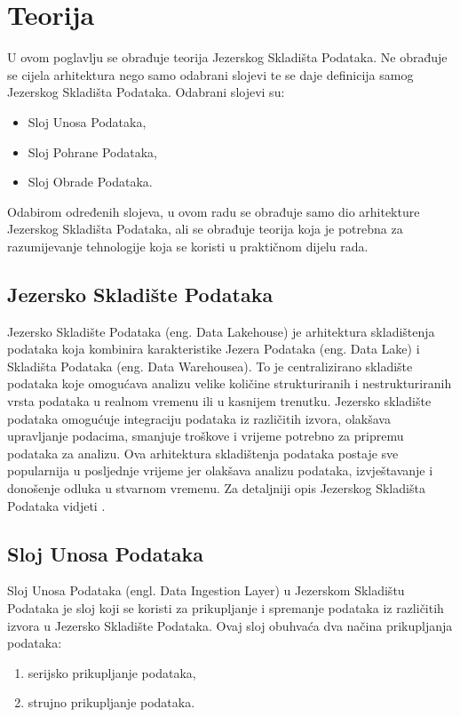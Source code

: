 \chapter{Teorija} \label{chapter:teorija} 

U ovom poglavlju se obrađuje teorija Jezerskog Skladišta Podataka. Ne obrađuje
se cijela arhitektura nego samo odabrani slojevi te se daje definicija samog
Jezerskog Skladišta Podataka. Odabrani slojevi su:
\begin{itemize}
    \item Sloj Unosa Podataka,
    \item Sloj Pohrane Podataka,
    \item Sloj Obrade Podataka.
\end{itemize}
Odabirom određenih slojeva, u ovom radu se obrađuje samo dio arhitekture
Jezerskog Skladišta Podataka, ali se obrađuje teorija koja je potrebna za
razumijevanje tehnologije koja se koristi u praktičnom dijelu rada. 

\section{Jezersko Skladište Podataka} \label{section:jezersko_skladiste_podataka}

Jezersko Skladište Podataka (eng. Data Lakehouse) je arhitektura skladištenja
podataka koja kombinira karakteristike Jezera Podataka (eng. Data Lake) i
Skladišta Podataka (eng. Data Warehousea). To je centralizirano skladište
podataka koje omogućava analizu velike količine strukturiranih i
nestrukturiranih vrsta podataka u realnom vremenu ili u kasnijem trenutku.
Jezersko skladište podataka omogućuje integraciju podataka iz različitih izvora,
olakšava upravljanje podacima, smanjuje troškove i vrijeme potrebno za pripremu
podataka za analizu. Ova arhitektura skladištenja podataka postaje sve
popularnija u posljednje vrijeme jer olakšava analizu podataka, izvještavanje i
donošenje odluka u stvarnom vremenu. Za detaljniji opis Jezerskog Skladišta
Podataka vidjeti \cite{datalakehouse2022}.

\section{Sloj Unosa Podataka} \label{section:sloj_unosa_podataka}

Sloj Unosa Podataka (engl. Data Ingestion Layer) u Jezerskom Skladištu Podataka
je sloj koji se koristi za prikupljanje i spremanje podataka iz različitih
izvora u Jezersko Skladište Podataka. Ovaj sloj obuhvaća dva načina prikupljanja
podataka:
\begin{enumerate}
    \item serijsko prikupljanje podataka,
    \item strujno prikupljanje podataka.
\end{enumerate}

